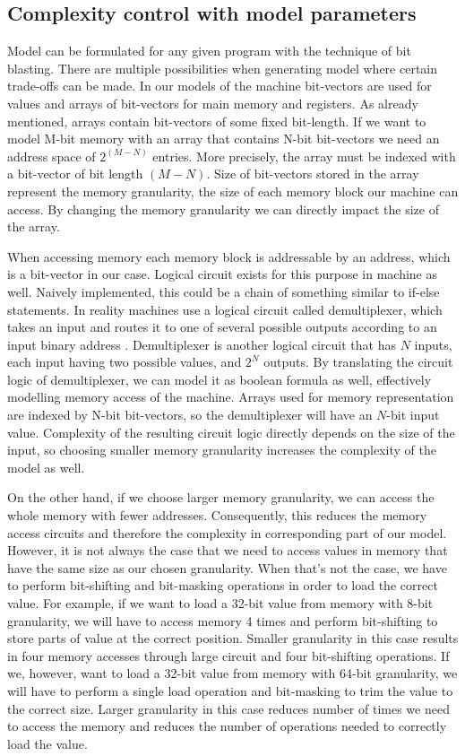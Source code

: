 \documentclass[12pt]{article}
\begin{document}
\subsection{Complexity control with model parameters}

Model can be formulated for any given program with the technique of bit
blasting. There are multiple possibilities when generating model where certain
trade-offs can be made. In our models of the machine bit-vectors are used for
values and arrays of bit-vectors for main memory and registers. As already
mentioned, arrays contain bit-vectors of some fixed bit-length. If we want to
model M-bit memory with an array that contains N-bit bit-vectors we need an
address space of $2^{(M - N)}$ entries. More precisely, the array must be
indexed with a bit-vector of bit length $(M - N)$. Size of bit-vectors stored
in the array represent the memory granularity, the size of each memory block
our machine can access. By changing the memory granularity we can directly
impact the size of the array.

When accessing memory each memory block is addressable by an address, which is
a bit-vector in our case. Logical circuit exists for this purpose in machine as
well. Naively implemented, this could be a chain of something similar to
if-else statements. In reality machines use a logical circuit called
demultiplexer, which takes an input and routes it to one of several possible
outputs according to an input binary address \cite{horowitz1989art}.
Demultiplexer is another logical circuit that has $N$ inputs, each input having
two possible values, and $2^N$ outputs. By translating the circuit logic of
demultiplexer, we can model it as boolean formula as well, effectively
modelling memory access of the machine. Arrays used for memory representation
are indexed by N-bit bit-vectors, so the demultiplexer will have an $N$-bit
input value. Complexity of the resulting circuit logic directly depends on the 
size of the input, so choosing smaller memory granularity increases the
complexity of the model as well.

On the other hand, if we choose larger memory granularity, we can access the
whole memory with fewer addresses. Consequently, this reduces the memory access
circuits and therefore the complexity in corresponding part of our model.
However, it is not always the case that we need to access values in memory that
have the same size as our chosen granularity. When that's not the case, we have
to perform bit-shifting and bit-masking operations in order to load the correct
value. For example, if we want to load a 32-bit value from memory with 8-bit
granularity, we will have to access memory 4 times and perform bit-shifting to
store parts of value at the correct position. Smaller granularity in this case
results in four memory accesses through large circuit and four bit-shifting
operations. If we, however, want to load a 32-bit value from memory with 64-bit
granularity, we will have to perform a single load operation and bit-masking to
trim the value to the correct size. Larger granularity in this case reduces 
number of times we need to access the memory and reduces the number of
operations needed to correctly load the value.
\end{document}
